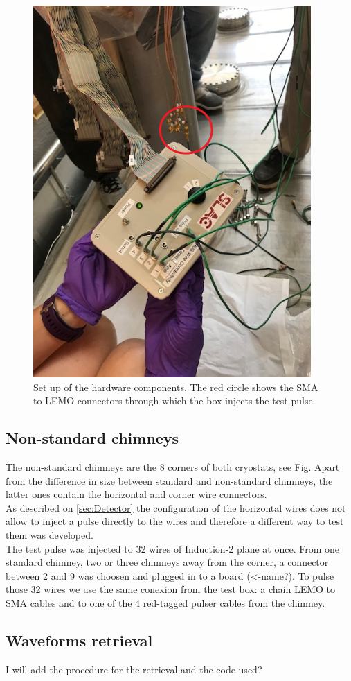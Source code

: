 \begin{enumerate}
\begin{figure}[H]
\centering
\includegraphics[scale=0.6]{fig/setup}
\caption{Set up of the hardware components. The red circle shows the SMA to LEMO connectors through which the box injects the test pulse.}
\end{figure}




\end{enumerate}




\subsection{Non-standard chimneys}
\label{ssec:nonStd_chimn}

The non-standard chimneys are the 8 corners of both cryostats, see Fig. Apart from the difference in size between standard and non-standard chimneys, the latter ones contain the horizontal and corner wire connectors. \\

As described on \cref{sec:Detector} the configuration of the horizontal wires does not allow to inject a pulse directly to the wires and therefore a different way to test them was developed. \\
The test pulse was injected to 32 wires of Induction-2 plane at once. From one standard chimney, two or three chimneys away from the corner, a connector between 2 and 9 was choosen and plugged in to a board (<-name?). To pulse those 32 wires we use the same conexion from the test box: a chain LEMO to SMA cables and to one of the 4 red-tagged pulser cables from the chimney.  


\subsection{Waveforms retrieval}
\label{ssec:DAQ}

I will add the procedure for the retrieval and the code used?

